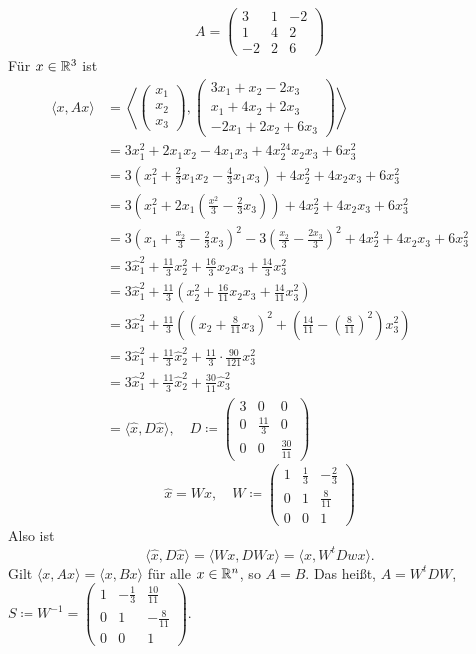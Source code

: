 \begin{beispiel}
	\[ A=\begin{pmatrix}
	3&1&-2\\1&4&2\\-2&2&6
	\end{pmatrix} \]
	F\"ur $ x\in\mathbb{R}^3 $ ist \begin{align*} \langle x,Ax\rangle&=\left\langle \begin{pmatrix}
	x_1\\x_2\\x_3
	\end{pmatrix},\begin{pmatrix}
	3x_1+x_2-2x_3\\x_1+4x_2+2x_3\\-2x_1+2x_2+6x_3
	\end{pmatrix}\right\rangle\\&=3x_1^2+2x_1x_2-4x_1x_3+4x_2^24x_2x_3+6x_3^2\\&=3\left(x_1^2+\frac{2}{3}x_1x_2-\frac{4}{3}x_1x_3\right)+4x_2^2+4x_2x_3+6x_3^2\\&=3\left(x_1^2+2x_1\left(\frac{x^2}{3}-\frac{2}{3}x_3\right)\right)+4x_2^2+4x_2x_3+6x_3^2\\&=3\left(x_1+\frac{x_2}{3}-\frac{2}{3}x_3\right)^2-3\left(\frac{x_2}{3}-\frac{2x_3}{3}\right)^2+4x_2^2+4x_2x_3+6x_3^2\\&=3\hat x_1^2+\frac{11}{3}x_2^2+\frac{16}{3}x_2x_3+\frac{14}{3}x_3^2\\&=3\hat x_1^2+\frac{11}{3}\left(x_2^2+\frac{16}{11}x_2x_3+\frac{14}{11}x_3^2\right)\\&=3\hat x_1^2+\frac{11}{3}\left(\left(x_2+\frac{8}{11}x_3\right)^2+\left(\frac{14}{11}-\left(\frac{8}{11}\right)^2\right)x_3^2\right)\\&=3\hat x_1^2+\frac{11}{3}\hat x_2^2+\frac{11}{3}\cdot\frac{90}{121}x_3^2\\&=3\hat x_1^2+\frac{11}{3}\hat x_2^2+\frac{30}{11}\hat x_3^2\\&=\langle\hat x,D\hat x\rangle,\quad D\coloneqq \begin{pmatrix}
	3&0&0\\0&\frac{11}{3}&0\\0&0&\frac{30}{11}
	\end{pmatrix} \end{align*}
	\[ \hat x=Wx,\quad W\coloneqq \begin{pmatrix}
	1&\frac{1}{3}&-\frac{2}{3}\\0&1&\frac{8}{11}\\0&0&1
	\end{pmatrix} \]
	Also ist
	\[ \langle\hat x,D\hat x\rangle=\langle Wx,DWx\rangle=\langle x,W^tDwx\rangle. \]
	Gilt $ \langle x,Ax\rangle=\langle x,Bx\rangle $ f\"ur alle $ x\in\mathbb{R}^n $, so $ A=B $. Das hei\ss t, $ A=W^tDW $, $ S\coloneqq W^{-1}=\begin{pmatrix}
	1&-\frac{1}{3}&\frac{10}{11}\\0&1&-\frac{8}{11}\\0&0&1
	\end{pmatrix} $.
\end{beispiel}
